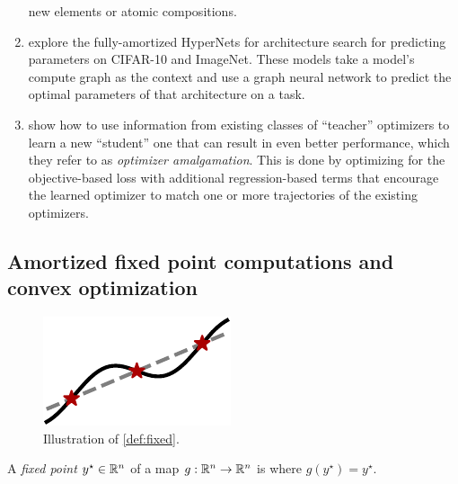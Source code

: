 \documentclass[twoside,11pt]{article}
\begin{document}
\begin{enumerate}
  new elements or atomic compositions.
\item \citet{zhang2018graph,knyazev2021parameter} explore
  the fully-amortized HyperNets for architecture search
  for predicting parameters on CIFAR-10 and ImageNet.
  These models take a model's compute graph as the
  context and use a graph neural network to predict
  the optimal parameters of that architecture on a task.
\item \citet{huang2022optimizer} show how to use
  information from existing classes of ``teacher''
  optimizers to learn a new ``student'' one that
  can result in even better performance,
  which they refer to as \emph{optimizer amalgamation}.
  This is done by optimizing for the objective-based
  loss with additional regression-based terms that
  encourage the learned optimizer to match one or
  more trajectories of the existing optimizers.
\end{enumerate}

\subsection{Amortized fixed point computations and convex optimization}
\label{sec:apps:convex}

\begin{figure}
\vspace{-3mm}
\includegraphics[width=\linewidth]{fig/fp.pdf}
\caption{Illustration of \cref{def:fixed}.}
\vspace{-3mm}
\end{figure}


\begin{definition}
  A \emph{fixed point} $y^\star\in\mathbb{R}^n$ of a map
  $g:\mathbb{R}^n\rightarrow\mathbb{R}^n$ is where $g(y^\star) = y^\star$.
  \label{def:fixed}
\end{definition}
\end{document}
